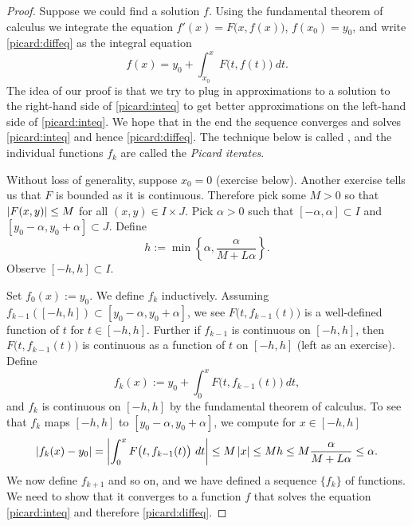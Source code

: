 \begin{proof}
Suppose we could find a solution $f$.  Using the fundamental
theorem of calculus we integrate the equation 
$f'(x) = F\bigl(x,f(x)\bigr)$, $f(x_0) = y_0$, and write \eqref{picard:diffeq}
as the integral equation
\begin{equation} \label{picard:inteq}
f(x) = y_0 + \int_{x_0}^x F\bigl(t,f(t)\bigr)~dt .
\end{equation}
The idea of our proof is that we try to plug in approximations to
a solution to the right-hand side of \eqref{picard:inteq} to get better approximations on the
left-hand side of  \eqref{picard:inteq}.  We hope that in the end the sequence 
converges and solves
\eqref{picard:inteq} and hence \eqref{picard:diffeq}.
The technique below is called \emph{},
and the individual functions $f_k$ are called the 
\emph{Picard iterates}.

Without loss of generality, suppose $x_0 = 0$ (exercise below).
Another
exercise tells us that $F$ is bounded as it is continuous.
Therefore pick some $M > 0$ so that 
$\left\lvert {F(x,y)} \right\rvert \leq M$ for all $(x,y) \in I\times J$.
Pick $\alpha > 0$ such that
$[-\alpha,\alpha] \subset I$ and $[y_0-\alpha, y_0 + \alpha] \subset J$.
Define
\begin{equation*}
h := \min \left\{ \alpha, \frac{\alpha}{M+L\alpha} \right\} .
\end{equation*}
Observe
$[-h,h] \subset I$.

Set $f_0(x) := y_0$.
We define $f_k$ inductively.
Assuming $f_{k-1}([-h,h]) \subset [y_0-\alpha,y_0+\alpha]$,
we see 
$F\bigl(t,f_{k-1}(t)\bigr)$ is
a well-defined function of $t$ for $t \in [-h,h]$.
Further if $f_{k-1}$ is continuous
on $[-h,h]$, then
$F\bigl(t,f_{k-1}(t)\bigr)$ is
continuous as
a function of $t$ on $[-h,h]$ (left as an exercise).
Define
\begin{equation*}
f_k(x) := y_0+ \int_{0}^x F\bigl(t,f_{k-1}(t)\bigr)~dt ,
\end{equation*}
and $f_k$ is continuous on $[-h,h]$ by the fundamental theorem of calculus.
To see that $f_k$ maps $[-h,h]$ to $[y_0-\alpha,y_0+\alpha]$, we compute for
$x \in [-h,h]$
\begin{equation*}
\left\lvert {f_k(x) - y_0} \right\rvert = 
\left\lvert {\int_{0}^x F\bigl(t,f_{k-1}(t)\bigr)~dt } \right\rvert
\leq
M\left\lvert {x} \right\rvert
\leq
Mh
\leq
M
\frac{\alpha}{M+L\alpha}
\leq \alpha .
\end{equation*}
We now define $f_{k+1}$ and so on, and
we have defined a sequence $\{ f_k \}$ of functions.  We need
to show that it converges to a function $f$ that solves
the equation \eqref{picard:inteq} and therefore \eqref{picard:diffeq}.


\end{proof}
